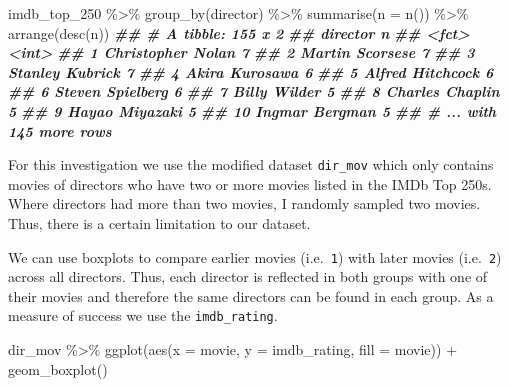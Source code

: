 \documentclass[
]{book}
\newenvironment{Shaded}{\begin{snugshade}}{\end{snugshade}}
\newcommand{\AttributeTok}[1]{\textcolor[rgb]{0.77,0.63,0.00}{#1}}
\newcommand{\DocumentationTok}[1]{\textcolor[rgb]{0.56,0.35,0.01}{\textbf{\textit{#1}}}}
\newcommand{\FunctionTok}[1]{\textcolor[rgb]{0.00,0.00,0.00}{#1}}
\newcommand{\NormalTok}[1]{#1}
\newcommand{\SpecialCharTok}[1]{\textcolor[rgb]{0.00,0.00,0.00}{#1}}
\begin{document}
\begin{Shaded}
\begin{Highlighting}[]
\NormalTok{imdb\_top\_250 }\SpecialCharTok{\%\textgreater{}\%}
  \FunctionTok{group\_by}\NormalTok{(director) }\SpecialCharTok{\%\textgreater{}\%}
  \FunctionTok{summarise}\NormalTok{(}\AttributeTok{n =} \FunctionTok{n}\NormalTok{()) }\SpecialCharTok{\%\textgreater{}\%}
  \FunctionTok{arrange}\NormalTok{(}\FunctionTok{desc}\NormalTok{(n))}
\DocumentationTok{\#\# \# A tibble: 155 x 2}
\DocumentationTok{\#\#    director              n}
\DocumentationTok{\#\#    \textless{}fct\textgreater{}             \textless{}int\textgreater{}}
\DocumentationTok{\#\#  1 Christopher Nolan     7}
\DocumentationTok{\#\#  2 Martin Scorsese       7}
\DocumentationTok{\#\#  3 Stanley Kubrick       7}
\DocumentationTok{\#\#  4 Akira Kurosawa        6}
\DocumentationTok{\#\#  5 Alfred Hitchcock      6}
\DocumentationTok{\#\#  6 Steven Spielberg      6}
\DocumentationTok{\#\#  7 Billy Wilder          5}
\DocumentationTok{\#\#  8 Charles Chaplin       5}
\DocumentationTok{\#\#  9 Hayao Miyazaki        5}
\DocumentationTok{\#\# 10 Ingmar Bergman        5}
\DocumentationTok{\#\# \# ... with 145 more rows}
\end{Highlighting}
\end{Shaded}

For this investigation we use the modified dataset \texttt{dir\_mov} which only contains movies of directors who have two or more movies listed in the IMDb Top 250s. Where directors had more than two movies, I randomly sampled two movies. Thus, there is a certain limitation to our dataset.

We can use boxplots to compare earlier movies (i.e.~\texttt{1}) with later movies (i.e.~\texttt{2}) across all directors. Thus, each director is reflected in both groups with one of their movies and therefore the same directors can be found in each group. As a measure of success we use the \texttt{imdb\_rating}.

\begin{Shaded}
\begin{Highlighting}[]
\NormalTok{dir\_mov }\SpecialCharTok{\%\textgreater{}\%} 
  \FunctionTok{ggplot}\NormalTok{(}\FunctionTok{aes}\NormalTok{(}\AttributeTok{x =}\NormalTok{ movie, }\AttributeTok{y =}\NormalTok{ imdb\_rating, }\AttributeTok{fill =}\NormalTok{ movie)) }\SpecialCharTok{+}
  \FunctionTok{geom\_boxplot}\NormalTok{()}
\end{Highlighting}
\end{Shaded}
\end{document}
